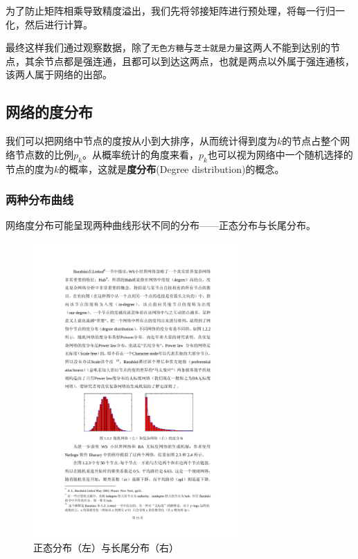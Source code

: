 \documentclass[a4paper]{article}
\begin{document}
\begin{spacing}{1.5}
为了防止矩阵相乘导致精度溢出，我们先将邻接矩阵进行预处理，将每一行归一化，然后进行计算。

最终这样我们通过观察数据，除了\verb"无色方糖"与\verb"芝士就是力量"这两人不能到达别的节点，其余节点都是强连通，且都可以到达这两点，也就是两点以外属于强连通核，该两人属于网络的出部。

\subsection{网络的度分布}
我们可以把网络中节点的度按从小到大排序，从而统计得到度为$k$的节点占整个网络节点数的比例$p_k$。从概率统计的角度来看，$p_k$也可以视为网络中一个随机选择的节点的度为$k$的概率，这就是\textbf{度分布}(Degree distribution)的概念。


\subsubsection{两种分布曲线}

网络度分布可能呈现两种曲线形状不同的分布——正态分布与长尾分布。
\begin{figure}[htp]
  \centering
  \includegraphics[width=8cm]{fig/f5.pdf}
  \caption{正态分布（左）与长尾分布（右）}\label{fb}
\end{figure}


\end{spacing}
\end{document}

